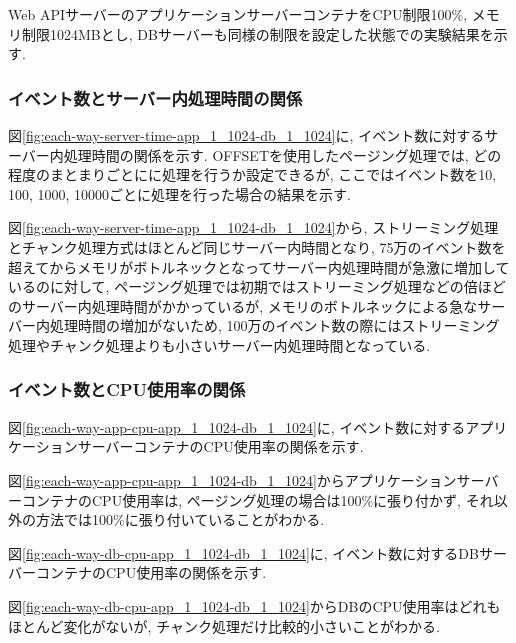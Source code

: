 \documentclass[../../../../main]{subfiles}
\begin{document}
    Web APIサーバーのアプリケーションサーバーコンテナをCPU制限100\%, メモリ制限1024MBとし, DBサーバーも同様の制限を設定した状態での実験結果を示す.

    \subsubsection{イベント数とサーバー内処理時間の関係}\label{subsubsubsec:result-each-way-only-limit-server-time}

    図\ref{fig:each-way-server-time-app_1_1024-db_1_1024}に, イベント数に対するサーバー内処理時間の関係を示す. OFFSETを使用したページング処理では, どの程度のまとまりごとにに処理を行うか設定できるが, ここではイベント数を10, 100, 1000, 10000ごとに処理を行った場合の結果を示す.

    

    図\ref{fig:each-way-server-time-app_1_1024-db_1_1024}から, ストリーミング処理とチャンク処理方式はほとんど同じサーバー内時間となり, 75万のイベント数を超えてからメモリがボトルネックとなってサーバー内処理時間が急激に増加しているのに対して, ページング処理では初期ではストリーミング処理などの倍ほどのサーバー内処理時間がかかっているが, メモリのボトルネックによる急なサーバー内処理時間の増加がないため, 100万のイベント数の際にはストリーミング処理やチャンク処理よりも小さいサーバー内処理時間となっている.

    \subsubsection{イベント数とCPU使用率の関係}\label{subsubsubsec:result-each-way-only-limit-cpu}

    図\ref{fig:each-way-app-cpu-app_1_1024-db_1_1024}に, イベント数に対するアプリケーションサーバーコンテナのCPU使用率の関係を示す.

    

    図\ref{fig:each-way-app-cpu-app_1_1024-db_1_1024}からアプリケーションサーバーコンテナのCPU使用率は, ページング処理の場合は100\%に張り付かず, それ以外の方法では100\%に張り付いていることがわかる.

    図\ref{fig:each-way-db-cpu-app_1_1024-db_1_1024}に, イベント数に対するDBサーバーコンテナのCPU使用率の関係を示す.

    

    図\ref{fig:each-way-db-cpu-app_1_1024-db_1_1024}からDBのCPU使用率はどれもほとんど変化がないが, チャンク処理だけ比較的小さいことがわかる.
\end{document}
